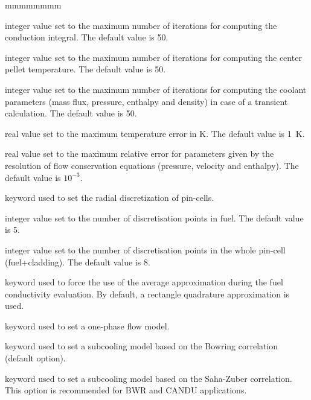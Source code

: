 \begin{ListeDeDescription}{mmmmmmmm}
\item[\dusa{maxit1}] integer value set to the maximum number of iterations for computing the
conduction integral. The default value is 50.

\item[\dusa{maxit2}] integer value set to the maximum number of iterations for computing the
center pellet temperature. The default value is 50.

\item[\dusa{maxit3}] integer value set to the maximum number of iterations for computing the
coolant parameters (mass flux, pressure, enthalpy and density) in case of a transient calculation. The default value is 50.

\item[\dusa{ermaxt}] real value set to the maximum temperature error in K. The default value is 1~K.

\item[\dusa{ermaxc}] real value set to the maximum relative  error for parameters given by the resolution of flow conservation equations (pressure, velocity and enthalpy). The default value is $10^{-3}$.

\item[\moc{RODMESH}] keyword used to set the radial discretization of pin-cells.

\item[\dusa{nb1}] integer value set to the number of discretisation points in fuel. The default value
is 5.

\item[\dusa{nb2}] integer value set to the number of discretisation points in the whole pin-cell (fuel+cladding). The default value
is 8.

\item[\moc{FORCEAVE}] keyword used to force the use of the average approximation during the fuel conductivity evaluation.
By default, a rectangle quadrature approximation is used.

\item[\moc{MONO}] keyword used to set a one-phase flow model.

\item[\moc{BOWR}] keyword used to set a subcooling model based on the Bowring correlation\cite{bowring} (default option).

\item[\moc{SAHA}] keyword used to set a subcooling model based on the Saha-Zuber correlation\cite{lahey}. This option is recommended for BWR and CANDU applications.


\end{ListeDeDescription}
